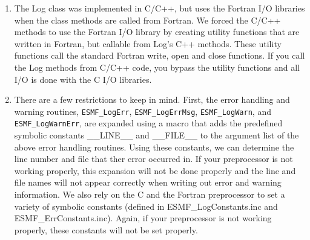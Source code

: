 %


\begin{enumerate}

\item The Log class was implemented in C/C++, but uses the Fortran I/O libraries when
the class methods are called from Fortran. We forced the C/C++ methods 
to use the Fortran I/O library by creating 
utility functions that are written in Fortran, but callable from Log's C++ methods.
These utility functions call the standard Fortran write, open and close functions.
If you call the Log methods from C/C++ code, you bypass the utility functions
and all I/O is done with the C I/O libraries.

\item There are a few restrictions to keep in mind.  First, the error handling and
warning routines, {\tt ESMF\_LogErr}, {\tt ESMF\_LogErrMsg}, {\tt ESMF\_LogWarn},
and {\tt ESMF\_LogWarnErr},
are expanded using a macro that adds the
predefined symbolic constants \_\_LINE\_\_ and \_\_FILE\_\_ to the argument list of the above
error handling routines. Using these constants, we can determine the line number and file that ther
error occurred in.  If
your preprocessor is not working properly, this expansion will not be done properly and
the line and file names will not appear correctly when writing out error and warning
information. We also rely on the C and the Fortran preprocessor
to set a variety of symbolic constants (defined in ESMF\_LogConstants.inc and 
ESMF\_ErrConstants.inc).  Again, if your preprocessor is not working properly, these
constants will not be set properly. 

\end{enumerate}



